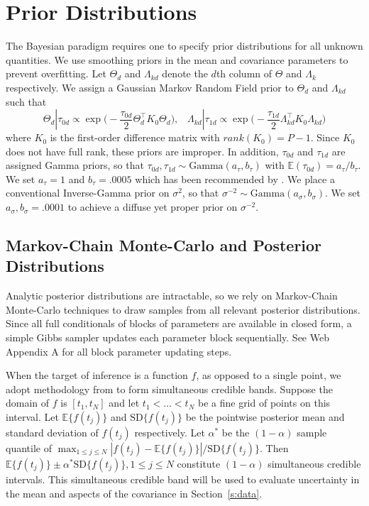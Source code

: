 \documentclass[useAMS,usenatbib]{biom}
\begin{document}
\section{Prior Distributions}
\label{s:priors}
The Bayesian paradigm requires one to specify prior distributions for all unknown quantities. We use smoothing priors in the mean and covariance parameters to prevent overfitting. Let $\Theta_{d}$ and $\Lambda_{kd}$ denote the $d$th column of $\Theta$ and $\Lambda_{k}$ respectively. We assign a Gaussian Markov Random Field prior to $\Theta_{d}$ and $\Lambda_{kd}$ such that
\begin{equation*}
\Theta_{d}|\tau_{0d} \propto \exp\bigg(-\frac{\tau_{0d}}{2}\Theta_{d}^{\top}K_{0}\Theta_{d}\bigg),\;\;\;\Lambda_{kd}|\tau_{1d}\propto\exp\bigg(-\frac{\tau_{1d}}{2}\Lambda_{kd}^{\top}K_{0}\Lambda_{kd}\bigg)
\end{equation*}
where $K_{0}$ is the first-order difference matrix with $rank(K_{0}) = P-1$. Since $K_{0}$ does not have full rank, these priors are improper. In addition, $\tau_{0d}$ and $\tau_{1d}$ are assigned Gamma priors, so that $\tau_{0d},\tau_{1d}\sim \text{Gamma}(a_{\tau}, b_{\tau})$ with $\mathbb{E}(\tau_{0d}) = a_{\tau}/b_{\tau}$. We set $a_{\tau} = 1$ and $b_{\tau} =.0005$ which has been recommended by \citet{Lang2004}. We place a conventional Inverse-Gamma prior on $\sigma^{2}$, so that $\sigma^{-2} \sim \text{Gamma}(a_{\sigma}, b_{\sigma})$. We set $a_{\sigma},b_{\sigma} = .0001$ to achieve a diffuse yet proper prior on $\sigma^{-2}$.

\subsection{Markov-Chain Monte-Carlo and Posterior Distributions}
\label{s:posteriors}
Analytic posterior distributions are intractable, so we rely on Markov-Chain Monte-Carlo techniques to draw samples from all relevant posterior distributions. Since all full conditionals of blocks of parameters are available in closed form, a simple Gibbs sampler updates each parameter block sequentially. See Web Appendix A for all block parameter updating steps.

When the target of inference is a function $f$, as opposed to a single point, we adopt methodology from \citet{Crainiceanu2007} to form simultaneous credible bands. Suppose the domain of $f$ is $[t_{1}, t_{N}]$ and let $t_{1} < \ldots < t_{N}$ be a fine grid of points on this interval. Let $\mathbb{E}\{f(t_{j})\}$ and $\text{SD}\{f(t_{j})\}$ be the pointwise posterior mean and standard deviation of $f(t_{j})$ respectively. Let $\alpha^{*}$ be the $(1-\alpha)$ sample quantile of $\max_{1\leq j \leq N} |f(t_{j}) - \mathbb{E}\{f(t_{j})\}|/\text{SD}\{f(t_{j})\}$. Then $\mathbb{E}\{f(t_{j})\} \pm \alpha^{*} \text{SD}\{f(t_{j})\}, 1\leq j\leq N$ constitute $(1-\alpha)$ simultaneous credible intervals. This simultaneous credible band will be used to evaluate uncertainty in the mean and aspects of the covariance in Section~\ref{s:data}.
\end{document}
